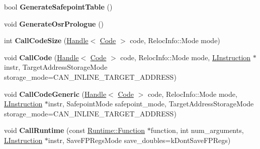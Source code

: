 \begin{DoxyCompactItemize}
\item 
bool {\bfseries Generate\+Safepoint\+Table} ()\hypertarget{classv8_1_1internal_1_1_l_code_gen_aa8cc24b1134b87ea8ce0a9a5c5688b5a}{}\label{classv8_1_1internal_1_1_l_code_gen_aa8cc24b1134b87ea8ce0a9a5c5688b5a}

\item 
void {\bfseries Generate\+Osr\+Prologue} ()\hypertarget{classv8_1_1internal_1_1_l_code_gen_a911d24be4ac4e392d736d9769b7ebb8f}{}\label{classv8_1_1internal_1_1_l_code_gen_a911d24be4ac4e392d736d9769b7ebb8f}

\item 
int {\bfseries Call\+Code\+Size} (\hyperlink{classv8_1_1internal_1_1_handle}{Handle}$<$ \hyperlink{classv8_1_1internal_1_1_code}{Code} $>$ code, Reloc\+Info\+::\+Mode mode)\hypertarget{classv8_1_1internal_1_1_l_code_gen_a8d5e2239e88ef24da70e0aff41991003}{}\label{classv8_1_1internal_1_1_l_code_gen_a8d5e2239e88ef24da70e0aff41991003}

\item 
void {\bfseries Call\+Code} (\hyperlink{classv8_1_1internal_1_1_handle}{Handle}$<$ \hyperlink{classv8_1_1internal_1_1_code}{Code} $>$ code, Reloc\+Info\+::\+Mode mode, \hyperlink{classv8_1_1internal_1_1_l_instruction}{L\+Instruction} $\ast$instr, Target\+Address\+Storage\+Mode storage\+\_\+mode=C\+A\+N\+\_\+\+I\+N\+L\+I\+N\+E\+\_\+\+T\+A\+R\+G\+E\+T\+\_\+\+A\+D\+D\+R\+E\+SS)\hypertarget{classv8_1_1internal_1_1_l_code_gen_a6cd4bae3d63314ad48833851d8028608}{}\label{classv8_1_1internal_1_1_l_code_gen_a6cd4bae3d63314ad48833851d8028608}

\item 
void {\bfseries Call\+Code\+Generic} (\hyperlink{classv8_1_1internal_1_1_handle}{Handle}$<$ \hyperlink{classv8_1_1internal_1_1_code}{Code} $>$ code, Reloc\+Info\+::\+Mode mode, \hyperlink{classv8_1_1internal_1_1_l_instruction}{L\+Instruction} $\ast$instr, Safepoint\+Mode safepoint\+\_\+mode, Target\+Address\+Storage\+Mode storage\+\_\+mode=C\+A\+N\+\_\+\+I\+N\+L\+I\+N\+E\+\_\+\+T\+A\+R\+G\+E\+T\+\_\+\+A\+D\+D\+R\+E\+SS)\hypertarget{classv8_1_1internal_1_1_l_code_gen_a69215a451e79d323af9851e6d9891211}{}\label{classv8_1_1internal_1_1_l_code_gen_a69215a451e79d323af9851e6d9891211}

\item 
void {\bfseries Call\+Runtime} (const \hyperlink{structv8_1_1internal_1_1_runtime_1_1_function}{Runtime\+::\+Function} $\ast$function, int num\+\_\+arguments, \hyperlink{classv8_1_1internal_1_1_l_instruction}{L\+Instruction} $\ast$instr, Save\+F\+P\+Regs\+Mode save\+\_\+doubles=k\+Dont\+Save\+F\+P\+Regs)\hypertarget{classv8_1_1internal_1_1_l_code_gen_ac9553032ed88d8b7b9a408c04124781f}{}\label{classv8_1_1internal_1_1_l_code_gen_ac9553032ed88d8b7b9a408c04124781f}


\end{DoxyCompactItemize}
